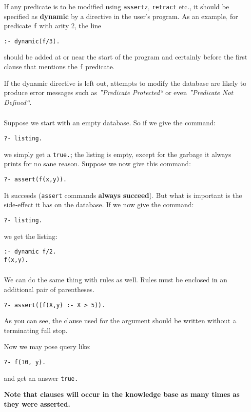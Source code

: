 \begin{frame}
	\frametitle{\insertsection}
	
	If any predicate is to be modified using \texttt{assertz}, \texttt{retract} etc., it should be specified as \textbf{dynamic} by a directive in the user's program. 
	As an example, for predicate \texttt{f} with arity 2, the line
	
	\texttt{:- dynamic(f/3).}
	
	should be added at or near the start of the program and certainly before the first clause that mentions the \texttt{f} predicate.
	
	If the dynamic directive is left out, attempts to modify the database are likely to produce error messages such as \textit{''Predicate Protected``} or even \textit{''Predicate Not Defined``}.
\end{frame}


\begin{frame}
	\frametitle{\insertsection}
	
	Suppose we start with an empty database. So if we give the command:
	
	\texttt{?- listing.}
	
	we simply get a \texttt{true.}; the listing is empty, except for the garbage it always prints for no sane reason. Suppose we now give this command:
	
	\texttt{?- assert(f(x,y)).}
	
	It succeeds (\texttt{assert} commands \textbf{always succeed}). But what is important is the side-effect it has on the database. If we now give the command:
	
	\texttt{?- listing.}

	we get the listing:
	
	\texttt{:- dynamic f/2.\\f(x,y).}
\end{frame}


\begin{frame}
	\frametitle{\insertsection}
	
	We can do the same thing with rules as well. Rules must be enclosed in an additional pair of parentheses.
	
	\texttt{?- assert((f(X,y) :- X > 5)).}
	
	As you can see, the clause used for the argument should be written without a terminating full stop.
	
	Now we may pose query like:
	
	\texttt{?- f(10, y).}
	
	and get an answer \texttt{true.}
	
	\textbf{Note that clauses will occur in the knowledge base as many times as they were asserted.}
\end{frame}


